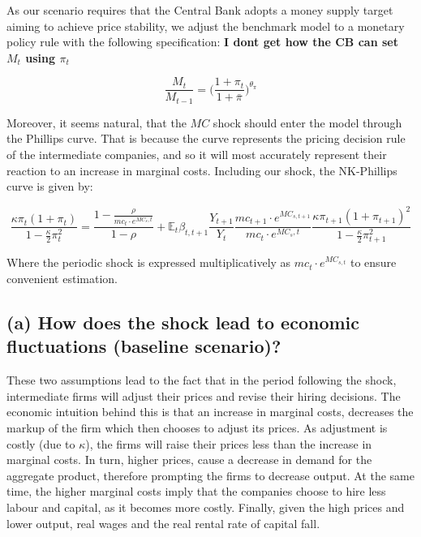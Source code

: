 \documentclass[12pt]{article}
\begin{document}
As our scenario requires that the Central Bank adopts a money supply target aiming to achieve price stability, we adjust the benchmark model to a monetary policy rule with the following specification: \textbf{I dont get how the CB can set $M_t$ using $\pi_t$}

\begin{equation}
    \frac{M_t}{M_{t-1}} = \Big(\frac{1+\pi_{t}}{1+ \bar \pi}\Big)^{\theta_{\pi}}
\end{equation}

Moreover, it seems natural, that the $MC$ shock should enter the model through the Phillips curve. That is because the curve represents the pricing decision rule of the intermediate companies, and so it will most accurately represent their reaction to an increase in marginal costs. Including our shock, the NK-Phillips curve is given by: 

\begin{equation}
    \frac{\kappa \pi_t (1 + \pi_t)}{1 - \frac{\kappa}{2} \pi_t^2}
    = \frac{1 - \frac{\rho}{mc_t \cdot e^{MC_s,t}}}{1 - \rho}
    + \mathbb{E}_t \beta_{t,t+1}
    \frac{Y_{t+1}}{Y_t}
    \frac{mc_{t+1} \cdot e^{MC_{s,t+1}}}{mc_t \cdot e^{MC_s,t}}
    \frac{\kappa \pi_{t+1} (1 + \pi_{t+1})^2}{1 - \frac{\kappa}{2} \pi_{t+1}^2}
\end{equation}

Where the periodic shock is expressed multiplicatively as $mc_t \cdot e^{MC_{s, t}}$ to ensure convenient estimation.

\subsection*{(a) How does the shock lead to economic fluctuations (baseline scenario)?}

These two assumptions lead to the fact that in the period following the shock, intermediate firms will adjust their prices and revise their hiring decisions. The economic intuition behind this is that an increase in marginal costs, decreases the markup of the firm which then chooses to adjust its prices. As adjustment is costly (due to $\kappa$), the firms will raise their prices less than the increase in marginal costs. In turn, higher prices, cause a decrease in demand for the aggregate product, therefore prompting the firms to decrease output. At the same time, the higher marginal costs imply that the companies choose to hire less labour and capital, as it becomes more costly. Finally, given the high prices and lower output, real wages and the real rental rate of capital fall.
\end{document}
